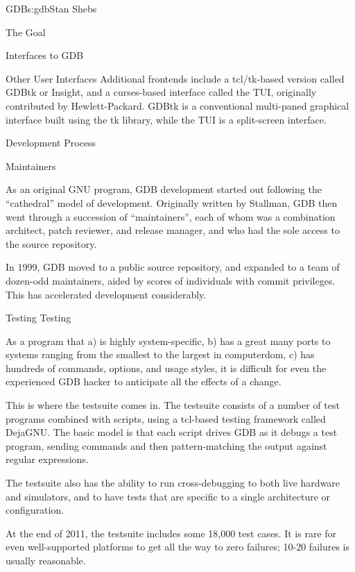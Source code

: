 \begin{aosachapter}{GDB}{s:gdb}{Stan Shebs}
\begin{aosasect1}{The Goal}
\begin{aosasect1}{Interfaces to GDB}
\begin{aosasect2}{Other User Interfaces}
Additional frontends include a tcl/tk-based version called GDBtk or
Insight, and a curses-based interface called the TUI, originally
contributed by Hewlett-Packard.  GDBtk is a conventional multi-paned
graphical interface built using the tk library, while the TUI is a
split-screen interface.

\end{aosasect2}

\end{aosasect1}

\begin{aosasect1}{Development Process}

\begin{aosasect2}{Maintainers}

As an original GNU program, GDB development started out following the
``cathedral'' model of development.  Originally written by Stallman,
GDB then went through a succession of ``maintainers'', each of whom
was a combination architect, patch reviewer, and release manager, and
who had the sole access to the source repository.

In 1999, GDB moved to a public source repository, and expanded to a
team of dozen-odd maintainers, aided by scores of individuals with
commit privileges.  This has accelerated development considerably.

\end{aosasect2}

\begin{aosasect2}{Testing Testing}

As a program that a) is highly system-specific, b) has a great many
ports to systems ranging from the smallest to the largest in
computerdom, c) has hundreds of commands, options, and usage styles,
it is difficult for even the experienced GDB hacker to anticipate all
the effects of a change.

This is where the testsuite comes in.  The testsuite consists of a
number of test programs combined with  scripts, using a
tcl-based testing framework called DejaGNU.  The basic model is that
each script drives GDB as it debugs a test program, sending commands and
then pattern-matching the output against regular expressions.

The testsuite also has the ability to run cross-debugging to both live
hardware and simulators, and to have tests that are specific to a
single architecture or configuration.

At the end of 2011, the testsuite includes some 18,000 test cases.  It
is rare for even well-supported platforms to get all the way to zero
failures; 10-20 failures is usually reasonable.


\end{aosasect2}
\end{aosasect1}
\end{aosasect1}
\end{aosachapter}

